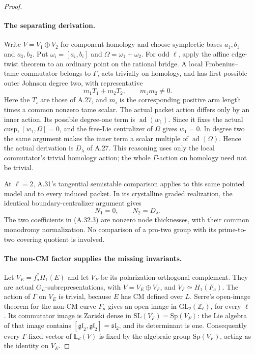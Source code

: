 \begin{proof}
\paragraph{The separating derivation.}
Write \(V=V_1\oplus V_2\) for component homology and
choose symplectic bases \(a_1,b_1\) and \(a_2,b_2\).
Put \(\omega_i=[a_i,b_i]\) and
\(\Omega=\omega_1+\omega_2\).
For odd \(\ell\), apply the affine edge-twist theorem
to an ordinary point on the rational bridge. A local
Frobenius--tame commutator belongs to \(\Gamma\), acts
trivially on homology, and has first possible outer
Johnson degree two, with representative
\[
                        m_1T_1+m_2T_2,
                         \qquad m_1m_2\ne0.             \tag{A.32.3}
\]
Here the \(T_i\) are those of A.27, and \(m_i\) is
the corresponding positive arm length times a common
nonzero tame scalar. The actual packet action differs
only by an inner action. Its possible degree-one term
is \(\operatorname{ad}(w_1)\). Since it fixes the actual
cusp, \([w_1,\Omega]=0\), and the free-Lie centralizer
of \(\Omega\) gives \(w_1=0\). In degree two the same
argument makes the inner term a scalar multiple of
\(\operatorname{ad}(\Omega)\). Hence the actual
derivation is \(D_\lambda\) of A.27. This reasoning
uses only the local commutator's trivial homology
action; the whole \(\Gamma\)-action on homology need
not be trivial.

At \(\ell=2\), A.31's tangential semistable comparison
applies to this same pointed model and to every
induced packet. In its crystalline graded realization,
the identical boundary-centralizer argument gives
\[
                       N_1=0,\qquad N_2=D_\lambda.
                                                        \tag{A.32.4}
\]
The two coefficients in (A.32.3) are nonzero node
thicknesses, with their common monodromy normalization.
No comparison of a pro-two group with its prime-to-two
covering quotient is involved.

\paragraph{The non-CM factor supplies the missing invariants.}
Let \(V_E=f_a^*H_1(E)\) and let \(V_F\) be its
polarization-orthogonal complement. They are actual
\(G_L\)-subrepresentations, with
\(V=V_E\oplus V_F\), and \(V_F\simeq H_1(F_a)\).
The action of \(\Gamma\) on \(V_E\) is trivial,
because \(E\) has CM defined over \(L\).
Serre's open-image theorem for the non-CM curve
\(F_a\) gives an open image in
\(\mathrm{GL}_2(\mathbb Z_\ell)\), for every \(\ell\)
\cite[Introduction (1)--(2), Theorem 3]{A_Serre1972}.
Its commutator image is Zariski dense in
\(\mathrm{SL}(V_F)=\mathrm{Sp}(V_F)\): the Lie
algebra of that image contains
\([\mathfrak{gl}_2,\mathfrak{gl}_2]=\mathfrak{sl}_2\),
and its determinant is one. Consequently every
\(\Gamma\)-fixed vector of \(\mathbb L_d(V)\) is
fixed by the algebraic group \(\mathrm{Sp}(V_F)\),
acting as the identity on \(V_E\).


\end{proof}
